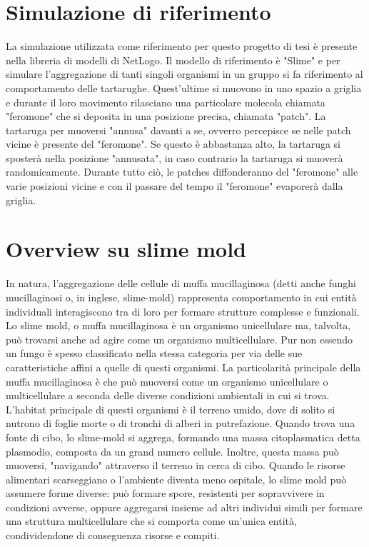 \documentclass[12pt,a4paper,openright,twoside]{book}
\begin{document}
\section{Simulazione di riferimento} \label{refSim}
La simulazione utilizzata come riferimento per questo progetto di tesi è presente nella libreria
di modelli di NetLogo\cite{wilensky1997netlogo}. Il modello di riferimento è "Slime"\cite{wilensky1997netlogo}
e per simulare l'aggregazione di tanti singoli organismi in un gruppo si fa riferimento al comportamento delle tartarughe.
Quest'ultime si muovono in uno spazio a griglia e durante il loro movimento rilasciano una particolare molecola
chiamata "feromone" che si deposita in una posizione precisa, chiamata "patch". La tartaruga per muoversi 
"annusa" davanti a se, ovverro percepisce se nelle patch vicine è presente del "feromone". Se questo è abbastanza alto, la 
tartaruga si sposterà nella posizione "annusata", in caso contrario la tartaruga si muoverà randomicamente. 
Durante tutto ciò, le patches diffonderanno del "feromone" alle varie posizioni vicine e con il passare del tempo 
il "feromone" evaporerà dalla griglia.

\section{Overview su slime mold}
In natura, l'aggregazione delle cellule di muffa mucillaginosa (detti anche funghi mucillaginosi o, in inglese, slime-mold) rappresenta
comportamento in cui entità individuali interagiscono tra di loro per formare strutture complesse e funzionali. 
Lo slime mold, o muffa mucillaginosa è un organismo unicellulare ma, talvolta, può trovarsi anche ad agire come un organismo multicellulare. 
Pur non essendo un fungo è spesso classificato nella stessa categoria per via delle sue caratteristiche affini a quelle di questi organismi.
La particolarità principale della muffa mucillaginosa è che può muoversi come un organismo unicellulare o multicellulare a seconda delle diverse 
condizioni ambientali in cui si trova.
L'habitat principale di questi organismi è il terreno umido, dove di solito si nutrono di foglie morte o di tronchi di alberi in putrefazione.
Quando trova una fonte di cibo, lo slime-mold si aggrega, formando una massa citoplasmatica detta plasmodio, composta da un grand numero cellule. Inoltre,
questa massa può muoversi, "navigando" attraverso il terreno in cerca di cibo.
Quando le risorse alimentari scarseggiano o l'ambiente diventa meno ospitale, lo slime mold può assumere forme diverse: può formare spore, 
resistenti per sopravvivere in condizioni avverse, oppure aggregarsi insieme ad altri individui simili per formare una struttura multicellulare
che si comporta come un'unica entità, condividendone di conseguenza risorse e compiti.
\end{document}
